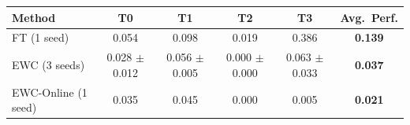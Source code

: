 \begin{tabular}{lcccc|c}
\toprule
Method & T0 & T1 & T2 & T3 & \textbf{Avg.\ Perf.} \\
\midrule
FT (1 seed) & 0.054 & 0.098 & 0.019 & 0.386 & \textbf{0.139} \\
EWC (3 seeds) & 0.028 $\pm$ 0.012 & 0.056 $\pm$ 0.005 & 0.000 $\pm$ 0.000 & 0.063 $\pm$ 0.033 & \textbf{0.037} \\
EWC-Online (1 seed) & 0.035 & 0.045 & 0.000 & 0.005 & \textbf{0.021} \\
\bottomrule
\end{tabular}